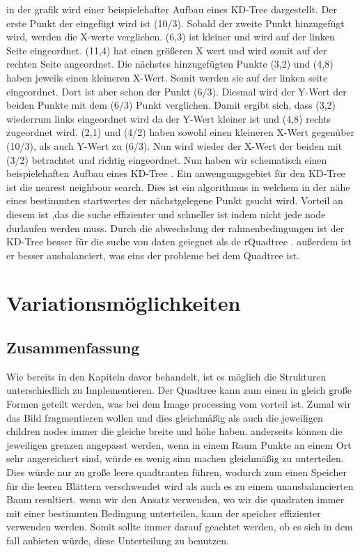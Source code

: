\documentclass[11pt]{article}
\newcommand{\qt}{Quadtree }
\newcommand{\kd}{KD-Tree }
\begin{document}
in der grafik wird einer beispielehafter Aufbau eines \kd dargestellt. Der erste Punkt der eingefügt wird ist (10/3). Sobald der zweite Punkt hinzugefügt wird, werden die X-werte verglichen. (6,3) ist kleiner und wird auf der linken Seite eingeordnet.
(11,4) hat einen größeren X wert und wird somit auf der rechten Seite angeordnet. Die nächstes hinzugefügten Punkte (3,2) und (4,8) haben jeweils einen kleineren X-Wert. Somit werden sie auf der linken seite eingeordnet. Dort ist aber schon der Punkt (6/3).
Diesmal wird der Y-Wert der beiden Punkte mit dem (6/3) Punkt verglichen. Damit ergibt sich, dass (3,2) wiederrum links eingeordnet wird da der Y-Wert kleiner ist und (4,8) rechts zugeordnet wird. 
(2,1) und (4/2) haben sowohl einen kleineren X-Wert gegenüber (10/3), als auch Y-Wert zu (6/3). Nun wird wieder der X-Wert der beiden mit (3/2) betrachtet und richtig eingeordnet. Nun haben wir schematisch einen beispielehaften Aufbau eines \kd. 
\newline
Ein anwengungsgebiet für den \kd ist die nearest neighbour search.  Dies ist ein algorithmus in welchem in der nähe eines bestimmten startwertes der nächstgelegene Punkt gsucht wird. Vorteil an diesem ist ,das die suche effizienter und schneller ist indem nicht jede node durlaufen werden muss. 
Durch die abwechslung der rahmenbedingungen ist der \kd besser für die suche von daten geiegnet als de r\qt. außerdem ist er besser ausbalanciert, was eins der probleme bei dem \qt ist. 

\pagebreak

\section{Variationsmöglichkeiten} \label{Varianten}

\subsection{Zusammenfassung}
Wie bereits in den Kapiteln davor behandelt, ist es möglich die Strukturen unterschiedlich zu Implementieren. 
Der \qt kann zum einen in gleich große Formen geteilt werden, was bei dem Image processing vom vorteil ist. Zumal wir das Bild fragmentieren wollen und dies gleichmäßig als auch die jeweiligen children nodes immer die gleiche breite und höhe haben. anderseits können die jeweiligen grenzen angepasst werden, wenn in einem Raum Punkte an einem Ort sehr angereichert sind, würde es wenig sinn machen gleichmäßig zu unterteilen. 
Dies würde nur zu große leere quadtranten führen, wodurch zum einen Speicher für die leeren Blättern verschwendet wird als auch es zu einem unausbalancierten Baum resultiert. 
\newline
wenn wir den Ansatz verwenden, wo wir die quadraten immer mit einer bestimmten Bedingung unterteilen, kann der speicher effizienter verwenden werden.  Somit sollte immer darauf geachtet werden, ob es sich in dem fall anbieten würde, diese Unterteilung zu benutzen.
\end{document}
